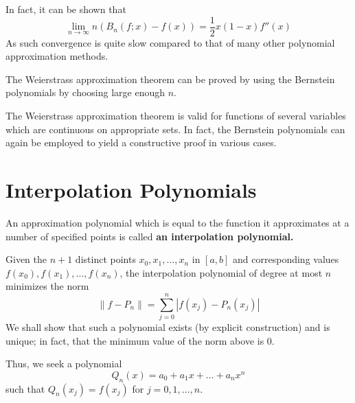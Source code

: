 \documentclass[../main.tex]{subfiles}
\begin{document}
In fact, it can be shown that
\begin{equation*}
	\lim_{n \to \infty} n(B_n(f;x) - f(x)) = \frac{1}{2} x(1-x) f''(x)
\end{equation*}
As such convergence is quite slow compared to that of many other polynomial approximation methods.

The Weierstrass approximation theorem can be proved by using the Bernstein polynomials by choosing large enough $n$.

The Weierstrass approximation theorem is valid for functions of several variables which are continuous on appropriate sets. In fact, the Bernstein polynomials can again be employed to yield a constructive proof in various cases.

\section{Interpolation Polynomials}
An approximation polynomial which is equal to the function it approximates at a number of specified points is called \textbf{an interpolation polynomial.}

Given the $n+1$ distinct points $x_0, x_1, \dots, x_n$ in $[a,b]$ and corresponding values $f(x_0), f(x_1), \dots, f(x_n)$, the interpolation polynomial of degree at most $n$ minimizes the norm
\begin{equation}
	\| f - P_n \| = \sum_{j=0}^n |f(x_j) - P_n(x_j)|
\end{equation}
We shall show that such a polynomial exists (by explicit construction) and is unique; in fact, that the minimum value of the norm above is $0$.

Thus, we seek a polynomial
\begin{equation*}
	Q_n(x) = a_0 + a_1 x + \dots + a_n x^n
\end{equation*}
such that $Q_n(x_j) = f(x_j)$ for $j = 0, 1, \dots, n$.
\end{document}
